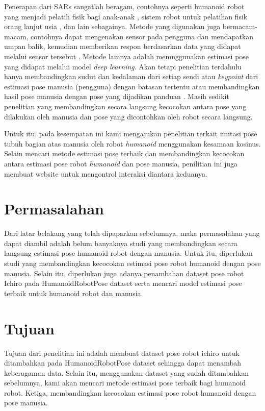 Penerapan dari SARs sangatlah beragam, contohnya seperti humanoid robot yang menjadi pelatih fisik bagi anak-anak \parencite{güneysu2017},
sistem robot untuk pelatihan fisik orang lanjut usia \parencite{avioz2021}, dan lain sebagainya. Metode yang digunakan juga bermacam-macam,
contohnya dapat mengenakan sensor pada pengguna dan mendapatkan umpan balik, kemudian memberikan respon berdasarkan data yang didapat melalui sensor tersebut \parencite{güneysu2017}.
Metode lainnya adalah memnggunakan estimasi pose yang didapat melalui model \emph{deep learning}.
Akan tetapi penelitian terdahulu hanya membandingkan sudut dan kedalaman dari setiap sendi atau \emph{keypoint} dari estimasi pose manusia (pengguna) dengan batasan tertentu atau membandingkan hasil pose manusia dengan pose yang dijadikan panduan \parencite{romeo}.
Masih sedikit penelitian yang membandingkan secara langsung kecocokan antara pose yang dilakukan oleh manusia dan pose yang dicontohkan oleh robot secara langsung.

Untuk itu, pada kesempatan ini kami mengajukan penelitian terkait imitasi pose tubuh bagian atas manusia oleh robot \emph{humanoid} menggunakan kesamaan kosinus.
Selain mencari metode estimasi pose terbaik dan membandingkan kecocokan antara estimasi pose robot \emph{humanoid} dan pose manusia, penilitian ini juga membuat website untuk mengontrol interaksi diantara keduanya.

\section{Permasalahan}
\label{sec:permasalahan}

Dari latar belakang yang telah dipaparkan sebelumnya, maka permasalahan yang dapat
diambil adalah belum banyaknya studi yang membandingkan secara langsung estimasi pose
humanoid robot dengan manusia. Untuk itu, diperlukan studi yang membandingkan kecocokan
estimasi pose robot humanoid dengan pose manusia. Selain itu, diperlukan juga adanya penambahan dataset pose robot Ichiro pada HumanoidRobotPose dataset serta mencari model estimasi
pose terbaik untuk humanoid robot dan manusia.

\section{Tujuan}
\label{sec:tujuan}

Tujuan dari penelitian ini adalah membuat dataset pose robot ichiro untuk ditambahkan
pada HumanoidRobotPose dataset sehingga dapat menambah keberagaman data. Selain itu,
menggunakan dataset yang sudah ditambahkan sebelumnya, kami akan mencari metode estimasi pose terbaik bagi humanoid robot. Ketiga, membandingkan kecocokan estimasi pose
robot humanoid dengan pose manusia.

